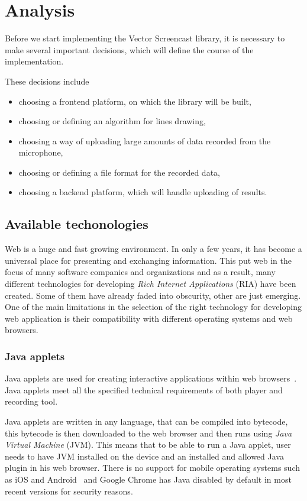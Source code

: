 \chapter{Analysis}

Before we start implementing the Vector Screencast library, it is necessary to make several important decisions, which will define the course of the implementation. 

These decisions include
\begin{itemize}
	\item choosing a frontend platform, on which the library will be built,
	\item choosing or defining an algorithm for lines drawing,
	\item choosing a way of uploading large amounts of data recorded from the microphone,
	\item choosing or defining a file format for the recorded data,
	\item choosing a backend platform, which will handle uploading of results.
\end{itemize}

\section{Available techonologies}

Web is a huge and fast growing environment. In only a few years, it has become a universal place for presenting and exchanging information. This put web in the focus of many software companies and organizations and as a result, many different technologies for developing \textit{Rich Internet Applications} (RIA) have been created. Some of them have already faded into obscurity, other are just emerging. One of the main limitations in the selection of the right technology for developing web application is their compatibility with different operating systems and web browsers.

\subsection{Java applets}
Java applets are used for creating interactive applications within web browsers~\cite{java}. Java applets meet all the specified technical requirements of both player and recording tool.

Java applets are written in any language, that can be compiled into bytecode, this bytecode is then downloaded to the web browser and then runs using \textit{Java Virtual Machine} (JVM). This means that to be able to run a Java applet, user needs to have JVM installed on the device and an installed and allowed Java plugin in his web browser. There is no support for mobile operating systems such as iOS and Android~\cite{java_mobile} and Google Chrome has Java disabled by default in most recent versions  for security reasons.

